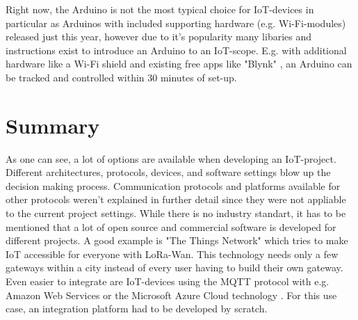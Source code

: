 Right now, the Arduino is not the most typical choice for IoT-devices in particular as Arduinos 
with included supporting hardware (e.g. Wi-Fi-modules) released just this year,
however due to it's popularity many libaries and instructions exist to introduce an Arduino to an IoT-scope.
E.g. with additional hardware like a Wi-Fi shield and existing free apps like "Blynk"  \parencite{blynk}, 
an Arduino can be tracked and controlled within 30 minutes of set-up.

\section{Summary}
As one can see, a lot of options are available when developing an IoT-project.
Different architectures, protocols, devices, and software settings blow up the decision making process.
Communication protocols and platforms available for other protocols weren't explained in further detail since they were not appliable to the current project settings.
While there is no industry standart, it has to be mentioned that a lot of open source and commercial software is developed for different projects.
A good example is "The Things Network" \parencite{ttn} which tries to make IoT accessible for everyone with LoRa-Wan.
This technology needs only a few gateways within a city instead of every user having to build their own gateway.
Even easier to integrate are IoT-devices using the MQTT protocol with e.g. Amazon Web Services \parencite{awsIOT} or the Microsoft Azure Cloud technology \parencite{msIOT}.
For this use case, an integration platform had to be developed by scratch.

